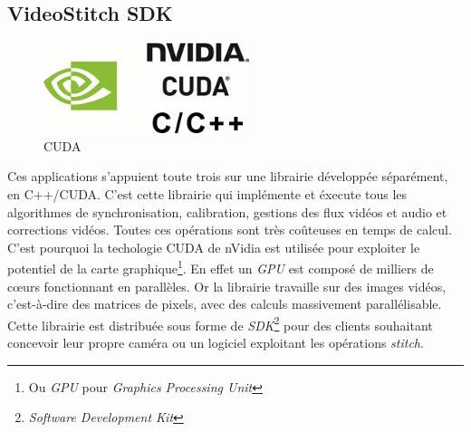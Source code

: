 \subsection{VideoStitch SDK}
\begin{figure}
  \centering
  \includegraphics[width=6cm]{images/cuda.jpg}
  \caption{CUDA}
\end{figure}
Ces applications s'appuient toute trois sur une librairie développée séparément,
en C++/CUDA. C'est cette librairie qui implémente et éxecute tous les algorithmes
de synchronisation, calibration, gestions des flux vidéos et audio et corrections
vidéos.
Toutes ces opérations sont très coûteuses en temps de calcul. C'est pourquoi
la techologie CUDA de nVidia est utilisée pour exploiter le potentiel de la carte
graphique\footnote{Ou \textit{GPU} pour \textit{Graphics Processing Unit}}. 
En effet un \textit{GPU} est composé de milliers de c\oe urs fonctionnant en parallèles.
Or la librairie travaille sur des images vidéos, c'est-à-dire des matrices de pixels,
avec des calculs massivement parallélisable\cite{videostitch-cuda}.\\
\newline
Cette librairie est distribuée sous forme de \textit{SDK}\footnote{\textit{Software Development Kit}}
pour des clients souhaitant concevoir leur propre caméra ou un logiciel exploitant
les opérations \textit{stitch}.

